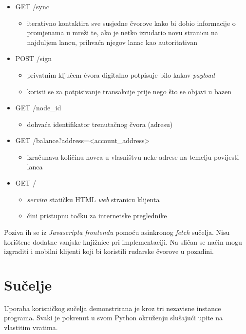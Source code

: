\documentclass[utf8, zavrsni]{fer}
\begin{document}
\begin{itemize}
\begin{itemize}
	\end{itemize}
	\item GET    /sync
	\begin{itemize}
		\item iterativno kontaktira sve susjedne čvorove kako bi dobio informacije o promjenama u mreži te, ako je netko izrudario novu stranicu na najduljem lancu, prihvaća njegov lanac kao autoritativan
	\end{itemize}
	\item POST   /sign
	\begin{itemize}
		\item privatnim ključem čvora digitalno potpisuje bilo kakav \textit{payload}
		\item koristi se za potpisivanje transakcije prije nego što se objavi u bazen
	\end{itemize}
	\item GET    /node\_id
	\begin{itemize}
		\item dohvaća identifikator trenutačnog čvora (adresu)
	\end{itemize}
	\item GET    /balance?address=<account\_address>
	\begin{itemize}
		\item izračunava količinu novca u vlasništvu neke adrese na temelju povijesti lanca
	\end{itemize}
	\item GET    /
	\begin{itemize}
		\item \textit{servira} statičku HTML \textit{web} stranicu klijenta
		\item čini pristupnu točku za internetske preglednike
	\end{itemize}
\end{itemize}

Poziva ih se iz \textit{Javascripta} \textit{frontendu} pomoću asinkronog \textit{fetch} sučelja. Nisu korištene dodatne vanjske knjižnice pri implementaciji. Na sličan se način mogu izgraditi i mobilni klijenti koji bi koristili rudarske čvorove u pozadini.
\newpage

\section{Sučelje}
Uporaba korisničkog sučelja demonstrirana je kroz tri nezavisne instance programa. Svaki je pokrenut u svom Python okruženju slušajući upite na vlastitim vratima.
\end{document}
